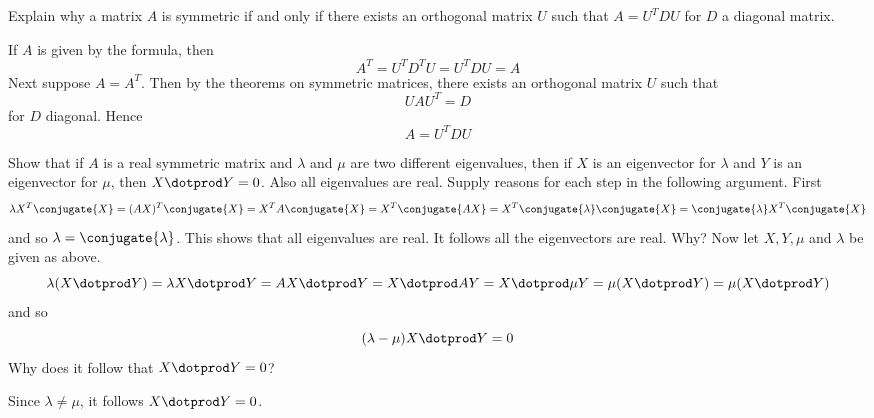 \begin{ex} Explain why a matrix $A$ is symmetric if and only if there exists an
orthogonal matrix $U$ such that $A=U^{T}DU$ for $D$ a diagonal matrix.
\begin{sol}
If $A$ is given by the formula, then
\[
A^{T}=U^{T}D^{T}U=U^{T}DU=A
\]
Next suppose $A=A^{T}$. Then by the theorems on symmetric matrices, there
exists an orthogonal matrix $U$ such that
\[
UAU^{T}=D
\]
for $D$ diagonal. Hence
\[
A=U^{T}DU
\]
\end{sol}
\end{ex}

\begin{ex} Show that if $A$ is a real symmetric matrix and
$\lambda $ and $\mu $ are two different eigenvalues, then if $X$ is
an eigenvector for $\lambda $ and $Y$ is an eigenvector for $\mu$,
then $X\dotprod Y=0$. Also all eigenvalues are real. Supply reasons
for each step in the following argument. First
\begin{equation*}
\lambda X^{T}\conjugate{X}=(AX) ^{T}
\conjugate{X}=X^{T}A\conjugate{X}=X^{T}
\conjugate{AX}=X^{T}\conjugate{\lambda }\conjugate{X}
=\conjugate{\lambda }X^{T}\conjugate{X}
\end{equation*}
and so $\lambda =\conjugate{\lambda }$. This shows that all eigenvalues are
real. It follows all the eigenvectors are real. Why? Now let $X,Y
,\mu $ and $\lambda $ be given as above. \
\begin{equation*}
\lambda (X\dotprod Y) =\lambda X\dotprod Y=AX\dotprod Y=X\dotprod AY=X\dotprod \mu Y=\mu (
X\dotprod Y) =\mu (X\dotprod Y)
\end{equation*}
and so
\begin{equation*}
(\lambda -\mu) X\dotprod Y=0
\end{equation*}
Why does it follow that $X\dotprod Y=0$?
\begin{sol}
Since $\lambda \neq \mu$, it follows $X \dotprod Y =0$.
\end{sol}
\end{ex}

